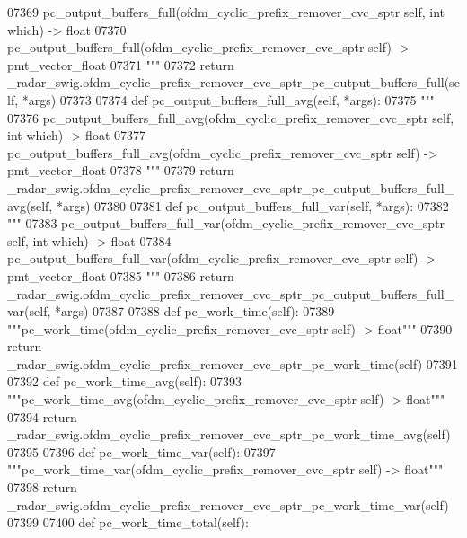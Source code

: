 \begin{DoxyCode}
{{{{{{{{{{{{{{{{{{{{{{{{07369 \textcolor{stringliteral}{        pc\_output\_buffers\_full(ofdm\_cyclic\_prefix\_remover\_cvc\_sptr self, int which) -> float}
07370 \textcolor{stringliteral}{        pc\_output\_buffers\_full(ofdm\_cyclic\_prefix\_remover\_cvc\_sptr self) -> pmt\_vector\_float}
07371 \textcolor{stringliteral}{        """}
07372         \textcolor{keywordflow}{return} \_radar\_swig.ofdm\_cyclic\_prefix\_remover\_cvc\_sptr\_pc\_output\_buffers\_full(self, *args)
07373 
07374     \textcolor{keyword}{def }pc_output_buffers_full_avg(self, *args):
07375         \textcolor{stringliteral}{"""}
07376 \textcolor{stringliteral}{        pc\_output\_buffers\_full\_avg(ofdm\_cyclic\_prefix\_remover\_cvc\_sptr self, int which) -> float}
07377 \textcolor{stringliteral}{        pc\_output\_buffers\_full\_avg(ofdm\_cyclic\_prefix\_remover\_cvc\_sptr self) -> pmt\_vector\_float}
07378 \textcolor{stringliteral}{        """}
07379         \textcolor{keywordflow}{return} \_radar\_swig.ofdm\_cyclic\_prefix\_remover\_cvc\_sptr\_pc\_output\_buffers\_full\_avg(self, *args)
07380 
07381     \textcolor{keyword}{def }pc_output_buffers_full_var(self, *args):
07382         \textcolor{stringliteral}{"""}
07383 \textcolor{stringliteral}{        pc\_output\_buffers\_full\_var(ofdm\_cyclic\_prefix\_remover\_cvc\_sptr self, int which) -> float}
07384 \textcolor{stringliteral}{        pc\_output\_buffers\_full\_var(ofdm\_cyclic\_prefix\_remover\_cvc\_sptr self) -> pmt\_vector\_float}
07385 \textcolor{stringliteral}{        """}
07386         \textcolor{keywordflow}{return} \_radar\_swig.ofdm\_cyclic\_prefix\_remover\_cvc\_sptr\_pc\_output\_buffers\_full\_var(self, *args)
07387 
07388     \textcolor{keyword}{def }pc_work_time(self):
07389         \textcolor{stringliteral}{"""pc\_work\_time(ofdm\_cyclic\_prefix\_remover\_cvc\_sptr self) -> float"""}
07390         \textcolor{keywordflow}{return} \_radar\_swig.ofdm\_cyclic\_prefix\_remover\_cvc\_sptr\_pc\_work\_time(self)
07391 
07392     \textcolor{keyword}{def }pc_work_time_avg(self):
07393         \textcolor{stringliteral}{"""pc\_work\_time\_avg(ofdm\_cyclic\_prefix\_remover\_cvc\_sptr self) -> float"""}
07394         \textcolor{keywordflow}{return} \_radar\_swig.ofdm\_cyclic\_prefix\_remover\_cvc\_sptr\_pc\_work\_time\_avg(self)
07395 
07396     \textcolor{keyword}{def }pc_work_time_var(self):
07397         \textcolor{stringliteral}{"""pc\_work\_time\_var(ofdm\_cyclic\_prefix\_remover\_cvc\_sptr self) -> float"""}
07398         \textcolor{keywordflow}{return} \_radar\_swig.ofdm\_cyclic\_prefix\_remover\_cvc\_sptr\_pc\_work\_time\_var(self)
07399 
07400     \textcolor{keyword}{def }pc_work_time_total(self):
}}}}}}}}}}}}}}}}}}}}}}}}
\end{DoxyCode}
